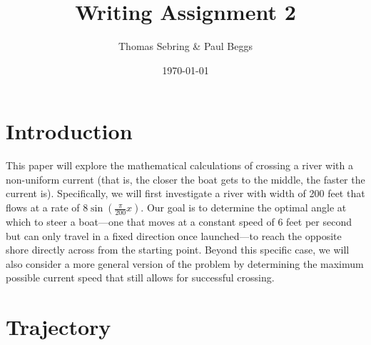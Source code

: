 \documentclass{article}
\title{Writing Assignment 2}
\author{Thomas Sebring \& Paul Beggs}
\date{\today}
\begin{document}
\maketitle

\section{Introduction}

This paper will explore the mathematical calculations of crossing a river with a non-uniform current (that is, the closer the boat gets to the middle, the faster the current is). Specifically, we will first investigate a river with width of 200 feet that flows at a rate of \(8\sin(\frac{\pi}{200}x)\). Our goal is to determine the optimal angle at which to steer a boat---one that moves at a constant speed of 6 feet per second but can only travel in a fixed direction once launched---to reach the opposite shore directly across from the starting point. Beyond this specific case, we will also consider a more general version of the problem by determining the maximum possible current speed that still allows for successful crossing.

\section{Trajectory}
\end{document}
